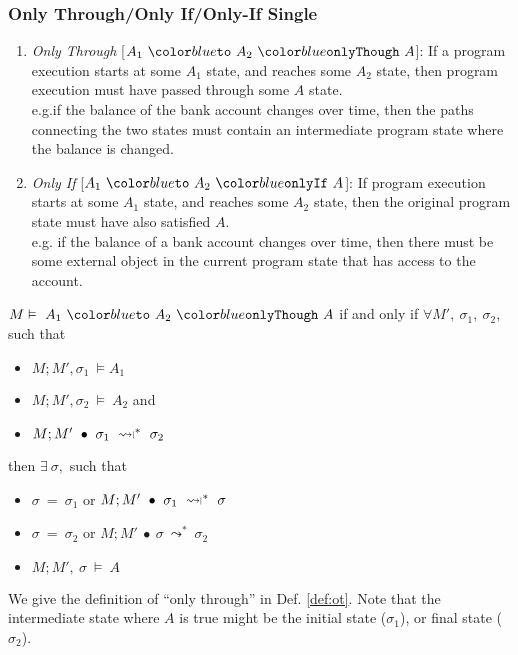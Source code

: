 \documentclass[acmsmall,review,anonymous]{acmart}\settopmatter{printfolios=true,printccs=false,printacmref=false}
\begin{document}
\subsubsection{Only Through/Only If/Only-If Single}

\begin{enumerate}
\item
\emph{Only Through} [$\onlyThrough{A_1}{A_2}{A}$]: If a program execution starts at some $A_1$ state, and reaches some $A_2$ state, then program execution must have passed through some $A$ state.\\
e.g.if the balance of the bank account changes over time, then the paths connecting the two states must contain 
an intermediate program state where the balance is changed.
\item
\emph{Only If} [$\onlyIf{A_1}{A_2}{A}$]: If program execution starts at some $A_1$ state, and reaches some $A_2$ state, 
then the original program state must have also satisfied $A$.\\
e.g. if the balance of a bank account changes over time, then there must be some external object in the current 
program state that has access to the account.
\end{enumerate}

\begin{definition}
\label{def:ot}
$M \vDash\ \onlyThrough {A_1}{A_2}{A}$ if and only if
$\forall M',\ \sigma_1,\ \sigma_2,$ such that 
\begin{itemize}
\item
$M ; M', \sigma_1\ \vDash A_1$
\item
$M ; M', \sigma_2\ \vDash\ A_2$ and
\item
$M ; M'\ \bullet\ \sigma_1\ \constrained^*\ \sigma_2$
\end{itemize}
then $\exists\ \sigma,$ such that
\begin{itemize}
\item
$\sigma\ =\ \sigma_1$ or $M ; M'\ \bullet\ \sigma_1\ \constrained^*\ \sigma$
\item
$\sigma\ =\ \sigma_2$ or $M ; M'\ \bullet\ \sigma\ \leadsto^*\ \sigma_2$
\item
$M ; M',\ \sigma\ \vDash\ A$
\end{itemize}
\end{definition}
We give the definition of ``only  through'' in Def. \ref{def:ot}. Note 
that the intermediate state where $A$ is true might be the initial state ($\sigma_1$),
or final state ($\sigma_2$). 
\end{document}
